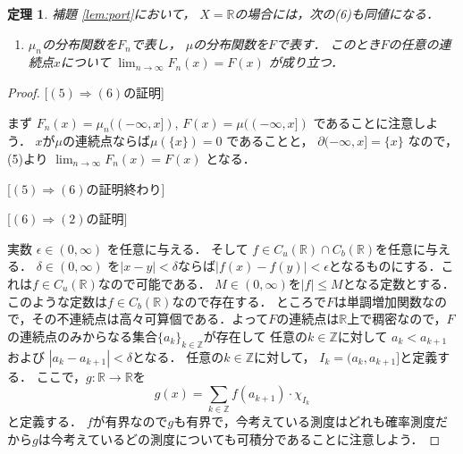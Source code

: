 \documentclass[leqno, a4paper, 12pt]{jsarticle}
\newtheorem{thm}{定理}
\newcommand{\To}{\Longrightarrow}
\newcommand{\zz}{\mathbb{Z}}
\newcommand{\rr}{\mathbb{R}}
\begin{document}
\begin{thm}\label{thm:r6}
補題 \ref{lem:port}において，
$X=\rr$の場合には，次の\emph{(6)}も同値になる．
\begin{enumerate}
		\item[\emph{(6)}] $\mu_{n}$の分布関数を$F_{n}$で表し，
		$\mu$の分布関数を$F$で表す．
		このとき$F$の任意の連続点$x$について
		$\lim_{n\to \infty}F_{n}(x)=F(x)$
		が成り立つ．

\end{enumerate}
\end{thm}
\begin{proof}

[$(5)\To (6)$の証明]

まず
$F_{n}(x)=\mu_{n}((-\infty, x])$, 
$F(x)=\mu((-\infty, x])$
であることに注意しよう．
$x$が$\mu$の連続点ならば$\mu(\{x\})=0$
であることと，
$\partial (-\infty, x]=\{x\}$
なので，(5)より
$\lim_{n\to \infty}F_{n}(x)=F(x)$
となる．


[$(5)\To (6)$の証明終わり]





[$(6)\To (2)$の証明]

実数
$\epsilon\in (0, \infty)$
を任意に与える．
そして
$f\in C_{u}(\rr)\cap C_{b}(\rr)$を任意に与える．
$\delta\in (0, \infty)$
を$|x-y|<\delta$ならば$|f(x)-f(y)|<\epsilon$となるものにする．これは$f\in C_{u}(\rr)$なので可能である．
$M\in (0, \infty)$を$|f|\le M$となる定数とする．
このような定数は$f\in C_{b}(\rr)$なので存在する．
ところで$F$は単調増加関数なので，その不連続点は高々可算個である．よって$F$の連続点は$\rr$上で稠密なので，$F$の連続点のみからなる集合$\{a_{k}\}_{k\in \zz}$が存在して
任意の$k\in \zz$に対して
$a_{k}<a_{k+1}$および
$|a_{k}-a_{k+1}|<\delta$となる．
任意の$k\in \zz$に対して，
$I_{k}=(a_{k}, a_{k+1}]$と定義する．
ここで，$g:\rr\to \rr$を
\[
g(x)=\sum_{k\in \zz}f(a_{k+1})\cdot \chi_{I_{k}}
\]
と定義する．
$f$が有界なので$g$も有界で，今考えている測度はどれも確率測度だから$g$は今考えているどの測度についても可積分であることに注意しよう．


\end{proof}
\end{document}
